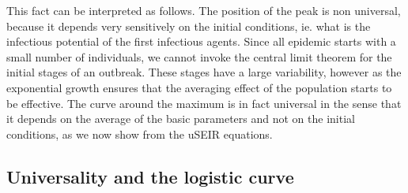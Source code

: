 \documentclass[a4paper,oneside,11pt]{article}
\begin{document}
  This fact can be interpreted as follows. The position of the peak is non universal, because it depends very sensitively on the initial conditions, ie. what is the infectious potential of the first infectious agents. Since all epidemic starts with a small number of individuals, we cannot invoke the central limit theorem for the initial stages of an outbreak. These stages have a large variability, however as the exponential growth ensures that the averaging effect of the population starts to be effective. The curve around the maximum is in fact universal in the sense that it depends on the average of the basic parameters and not on the initial conditions, as we now show from the uSEIR equations.
  
  \subsection{Universality and the logistic curve}
  
\end{document}

